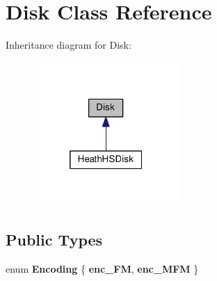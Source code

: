 \hypertarget{classDisk}{}\section{Disk Class Reference}
\label{classDisk}


Inheritance diagram for Disk\+:
\nopagebreak
\begin{figure}[H]
\begin{center}
\leavevmode
\includegraphics[width=157pt]{classDisk__inherit__graph}
\end{center}
\end{figure}
\subsection*{Public Types}
\begin{DoxyCompactItemize}
\item 
\hypertarget{classDisk_a2eaa045357515c1586d007fb0698fce3}{}enum {\bfseries Encoding} \{ {\bfseries enc\+\_\+\+F\+M}, 
{\bfseries enc\+\_\+\+M\+F\+M}
 \}\label{classDisk_a2eaa045357515c1586d007fb0698fce3}

\end{DoxyCompactItemize}
